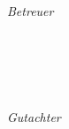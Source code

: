 \begin{titlepage}
	\vfill
	\begin{minipage}[t]{.27\textwidth}
		\raggedleft
		\textit{Betreuer}
	\end{minipage}
	\hspace*{15pt}
	\begin{minipage}[t]{.65\textwidth}
		{\large \thesisFirstReviewer} \\
	  	{\small \thesisFirstReviewerDepartment} \\[-1mm]
		{\small \thesisFirstReviewerUniversity}
	\end{minipage} \\[5mm]
	\begin{minipage}[t]{.27\textwidth}
		\raggedleft
		\textit{Gutachter}
	\end{minipage}
	\hspace*{15pt}
	\begin{minipage}[t]{.65\textwidth}
		{\large \thesisSecondReviewer} \\
	  	{\small \thesisSecondReviewerDepartment} \\[-1mm]
		{\small \thesisSecondReviewerUniversity}
	\end{minipage} \\[10mm]
	\thesisDate \\
\end{titlepage}